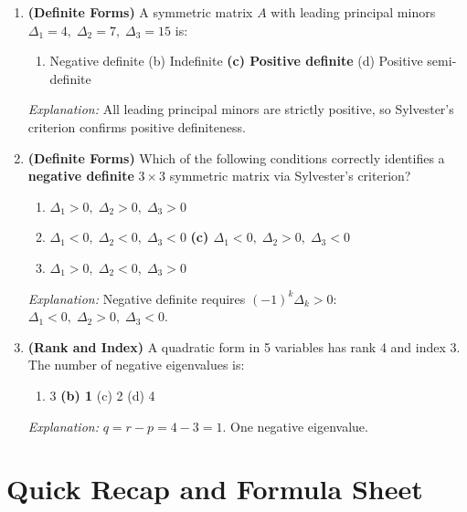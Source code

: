 \documentclass[12pt,a4paper]{article}
\begin{document}
\begin{enumerate}[label=\textbf{MCQ\arabic*.}, leftmargin=*]
  \item \textbf{(Definite Forms)} A symmetric matrix \(A\) with leading principal minors
        \(\Delta_1 = 4,\; \Delta_2 = 7,\; \Delta_3 = 15\) is:
        \begin{enumerate}[label=(\alph*), noitemsep]
          \item Negative definite \quad (b) Indefinite
          \quad \textbf{(c) Positive definite} \quad (d) Positive semi-definite
        \end{enumerate}
        \textit{Explanation:} All leading principal minors are strictly positive, so
        Sylvester's criterion confirms positive definiteness.

  \item \textbf{(Definite Forms)} Which of the following conditions correctly identifies
        a \textbf{negative definite} \(3 \times 3\) symmetric matrix via Sylvester's
        criterion?
        \begin{enumerate}[label=(\alph*), noitemsep]
          \item \(\Delta_1 > 0,\; \Delta_2 > 0,\; \Delta_3 > 0\)
          \item \(\Delta_1 < 0,\; \Delta_2 < 0,\; \Delta_3 < 0\)
          \textbf{(c) \(\Delta_1 < 0,\; \Delta_2 > 0,\; \Delta_3 < 0\)}
          \item \(\Delta_1 > 0,\; \Delta_2 < 0,\; \Delta_3 > 0\)
        \end{enumerate}
        \textit{Explanation:} Negative definite requires \((-1)^k \Delta_k > 0\):
        \(\Delta_1 < 0,\;\Delta_2 > 0,\;\Delta_3 < 0\).

  \item \textbf{(Rank and Index)} A quadratic form in 5 variables has rank 4 and index 3.
        The number of negative eigenvalues is:
        \begin{enumerate}[label=(\alph*), noitemsep]
          \item 3 \quad \textbf{(b) 1} \quad (c) 2 \quad (d) 4
        \end{enumerate}
        \textit{Explanation:} \(q = r - p = 4 - 3 = 1\). One negative eigenvalue.

\end{enumerate}

\section{Quick Recap and Formula Sheet}
\end{document}
